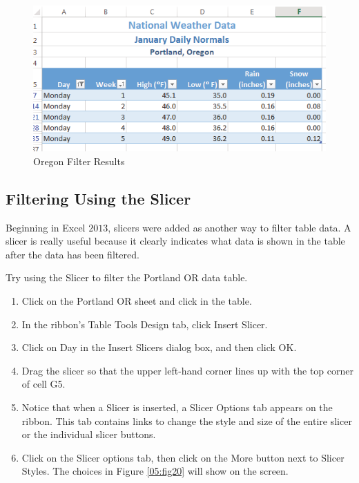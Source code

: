 \begin{figure}[H]
	\centering
	\includegraphics[width=\maxwidth{.95\linewidth}]{gfx/ch05_fig19}
	\caption{Oregon Filter Results}
	\label{05:fig19}
\end{figure}

\subsection{Filtering Using the Slicer}

Beginning in Excel $ 2013 $, slicers were added as another way to filter table data. A slicer is really useful because it clearly indicates what data is shown in the table after the data has been filtered.

Try using the Slicer to filter the Portland OR data table.

\begin{enumerate}
	\item Click on the Portland OR sheet and click in the table.
	\item In the ribbon's Table Tools Design tab, click Insert Slicer.
	\item Click on Day in the Insert Slicers dialog box, and then click OK.
	\item Drag the slicer so that the upper left-hand corner lines up with the top corner of cell G5.
	\item Notice that when a Slicer is inserted, a Slicer Options tab appears on the ribbon. This tab contains links to change the style and size of the entire slicer or the individual slicer buttons.
	\item Click on the Slicer options tab, then click on the More button next to Slicer Styles. The choices in Figure \ref{05:fig20} will show on the screen.
\end{enumerate}

